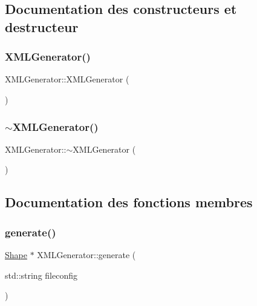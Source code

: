 \subsection{Documentation des constructeurs et destructeur}
\mbox{\label{class_x_m_l_generator_ae88722c986a3d984f0050be10d69e6aa}} 
\subsubsection{\texorpdfstring{X\+M\+L\+Generator()}{XMLGenerator()}}
{\footnotesize\ttfamily X\+M\+L\+Generator\+::\+X\+M\+L\+Generator (\begin{DoxyParamCaption}{ }\end{DoxyParamCaption})}

\mbox{\label{class_x_m_l_generator_a8f947bac9f682ba5a22ccb98ff88ff81}} 
\subsubsection{\texorpdfstring{$\sim$\+X\+M\+L\+Generator()}{~XMLGenerator()}}
{\footnotesize\ttfamily X\+M\+L\+Generator\+::$\sim$\+X\+M\+L\+Generator (\begin{DoxyParamCaption}{ }\end{DoxyParamCaption})}



\subsection{Documentation des fonctions membres}
\mbox{\label{class_x_m_l_generator_aea905ef316503fe716d368ae21f25b9b}} 
\subsubsection{\texorpdfstring{generate()}{generate()}}
{\footnotesize\ttfamily \hyperlink{class_shape}{Shape} $\ast$ X\+M\+L\+Generator\+::generate (\begin{DoxyParamCaption}\item[{std\+::string}]{fileconfig }\end{DoxyParamCaption})\hspace{0.3cm}{\ttfamily [virtual]}}

